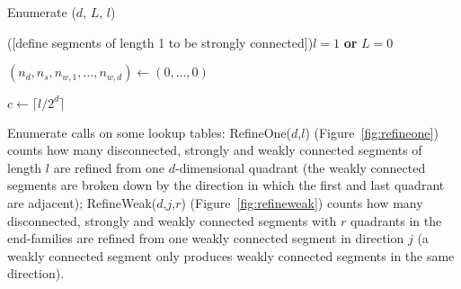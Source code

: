 \documentclass[a4paper,11pt]{article}
\newcommand{\spmod}{\!\mod}
\newcommand{\figref}[1]{Figure~\ref{fig:#1}}
\newcommand{\alglab}[1]{\label{alg:#1}}
\begin{document}
\begin{algorithm}
  \caption{Enumerate ($d$, $L$, $l$)
  }\alglab{enumerate}
  \DontPrintSemicolon



  \If (\hfill[define segments of length 1 to be strongly connected]){$l=1$ {\rm{\bf or}} $L=0$}{
  }


  $(n_d,n_s,n_{w,1},\dots,n_{w,d}) \leftarrow (0,\dots,0)$

  $c\leftarrow \lceil l/2^d \rceil$

  \lIf {$l \spmod 2^d < 2$}{$C \leftarrow 1 + \lfloor l/2^d \rfloor$
  }



\end{algorithm}

Enumerate calls on some lookup tables: RefineOne($d$,$l$) (\figref{refineone})
counts how many disconnected, strongly and weakly connected segments of length
$l$ are refined from one $d$-dimensional quadrant (the weakly connected
segments are broken down by the direction in which the first and last quadrant
are adjacent); RefineWeak($d$,$j$,$r$) (\figref{refineweak}) counts how many
disconnected, strongly and weakly connected segments with $r$ quadrants in the
end-families are refined from one weakly connected segment in direction $j$ (a
weakly connected segment only produces weakly connected segments in the same
direction). 
\end{document}
